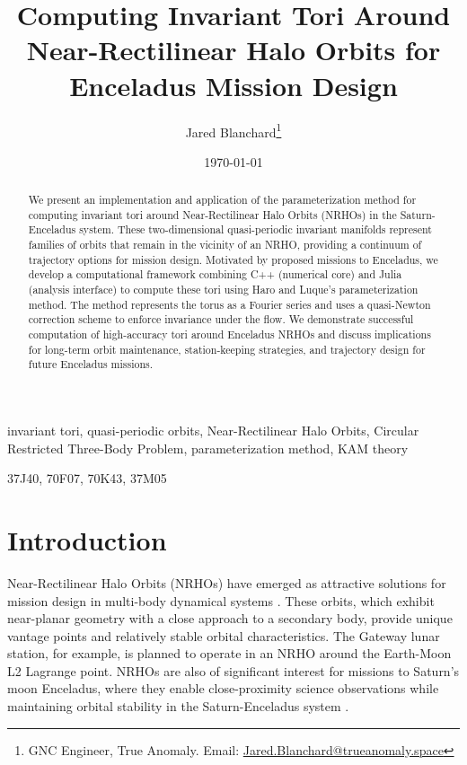 \documentclass[review,onefignum,onetabnum]{siamart220329}
\title{Computing Invariant Tori Around Near-Rectilinear Halo Orbits
       for Enceladus Mission Design}
\author{Jared Blanchard\thanks{GNC Engineer, True Anomaly.
        Email: \href{mailto:Jared.Blanchard@trueanomaly.space}{Jared.Blanchard@trueanomaly.space}}}
\date{\today}
\begin{document}
\maketitle

\begin{abstract}
We present an implementation and application of the parameterization method for
computing invariant tori around Near-Rectilinear Halo Orbits (NRHOs) in the
Saturn-Enceladus system. These two-dimensional quasi-periodic invariant manifolds
represent families of orbits that remain in the vicinity of an NRHO, providing
a continuum of trajectory options for mission design. Motivated by proposed
missions to Enceladus, we develop a computational framework combining C++
(numerical core) and Julia (analysis interface) to compute these tori using
Haro and Luque's parameterization method. The method represents the torus as
a Fourier series and uses a quasi-Newton correction scheme to enforce invariance
under the flow. We demonstrate successful computation of high-accuracy tori
around Enceladus NRHOs and discuss implications for long-term orbit maintenance,
station-keeping strategies, and trajectory design for future Enceladus missions.
\end{abstract}

\begin{keywords}
invariant tori, quasi-periodic orbits, Near-Rectilinear Halo Orbits,
Circular Restricted Three-Body Problem, parameterization method, KAM theory
\end{keywords}

\begin{AMS}
37J40, 70F07, 70K43, 37M05
\end{AMS}

\section{Introduction}
\label{sec:introduction}

Near-Rectilinear Halo Orbits (NRHOs) have emerged as attractive solutions for
mission design in multi-body dynamical systems \cite{howell2021near}. These
orbits, which exhibit near-planar geometry with a close approach to a secondary
body, provide unique vantage points and relatively stable orbital characteristics.
The Gateway lunar station, for example, is planned to operate in an NRHO around
the Earth-Moon L2 Lagrange point. NRHOs are also of significant interest for
missions to Saturn's moon Enceladus, where they enable close-proximity science
observations while maintaining orbital stability in the Saturn-Enceladus system
\cite{davis2017trajectory}.
\end{document}
